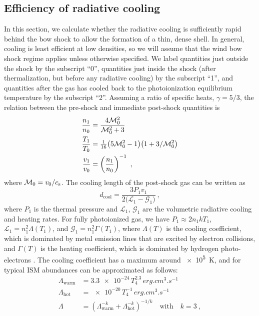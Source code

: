 \subsection{Efficiency of radiative cooling}
\label{sec:radi-cool-lengths}
%
In this section, we calculate whether the radiative cooling is
sufficiently rapid behind the bow shock to allow the formation of a
thin, dense shell.  In general, cooling is least efficient at low
densities, so we will assume that the wind bow shock regime applies
unless otherwise specified. We label quantities just outside the shock
by the subscript ``0'', quantities just inside the shock (after
thermalization, but before any radiative cooling) by the subscript
``1'', and quantities after the gas has cooled back to the
photoionization equilibrium temperature by the subscript ``2''.
Assuming a ratio of specific heats, \(\gamma = 5/3\), the relation between
the pre-shock and immediate post-shock quantities
\citep{ZelDovich:1967} is
\begin{align}
  \label{eq:shock-n-jump}
  \frac{n_1}{n_0} &= \frac{4 \mathcal{M}_0^2} {\mathcal{M}_0^2 + 3} \\
  \label{eq:shock-T-jump}
  \frac{T_1}{T_0} &= \tfrac1{16} \bigl( 5\mathcal{M}_0^2 - 1 \bigr) \bigl( 1 + 3/\mathcal{M}_0^2 \bigr) \\
  \label{eq:shock-v-jump}
  \frac{v_1}{v_0} &= \left(\frac{n_1}{n_0}\right)^{-1} \ ,
\end{align}
where \(\mathcal{M}_0 = v_0 / c_{\text{s}}\).  The cooling length of the post-shock
gas can be written as
\newcommand\cool{\ensuremath{_{\text{cool}}}}
\begin{equation}
  \label{eq:dcool}
  d\cool = \frac{3 P_1 v_1} { 2 \bigl(  \mathcal{L}_1 - \mathcal{G}_1 \bigr) }\ ,  
\end{equation}
where \(P_1\) is the thermal pressure and \(\mathcal{L}_1\),
\(\mathcal{G}_1\) are the volumetric radiative cooling and heating
rates.  For fully photoionized gas, we have
\(P_1 \approx 2 n_1 k T_1\), \(\mathcal{L}_1 = n_1^2 \Lambda(T_1)\), and
\(\mathcal{G}_1 = n_1^2 \Gamma(T_1)\), where \(\Lambda(T)\) is the cooling
coefficient, which is dominated by metal emission lines that are
excited by electron collisions, and \(\Gamma(T)\) is the heating
coefficient, which is dominated by hydrogen photo-electrons
\citep{Osterbrock:2006a}. The cooling coefficient has a maximum around
\SI{e5}{K}, and for typical ISM abundances can be approximated as
follows:
\begin{align}
  \label{eq:cooling-coefficient}
  \Lambda_{\text{warm}} &= \num{3.3e-24} \, T_4^{2.3} \, \si{erg.cm^{3}.s^{-1}}\\
  \Lambda_{\text{hot}} &= \num{e-20} \, T_4^{-1}\, \si{erg.cm^{3}.s^{-1}} \\
  \Lambda &= \left( \Lambda_{\text{warm}}^{-k} +  \Lambda_{\text{hot}}^{-k} \right)^{-1/k}
      \quad \text{with} \quad k = 3 \ ,
\end{align}

